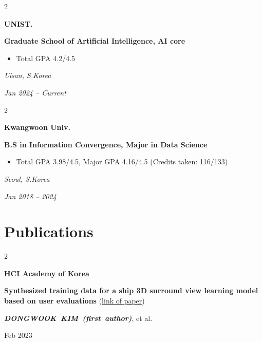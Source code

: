 \documentclass[10pt, letterpaper]{article}
\newenvironment{highlights}{
    \begin{itemize}[
        topsep=0.10 cm,
        parsep=0.10 cm,
        partopsep=0pt,
        itemsep=0pt,
        leftmargin=0.4 cm + 10pt
    ]
}{
    \end{itemize}
} %
\newenvironment{twocolentry}[2][]{
    \onecolentry
    \def\secondColumn{#2}
    \setcolumnwidth{\fill, 4.5 cm}
    \begin{paracol}{2}
}{
    \switchcolumn \raggedleft \secondColumn
    \end{paracol}
    \endonecolentry
} %
\let\hrefWithoutArrow\href
\renewcommand{\href}[2]{\hrefWithoutArrow{#1}{\ifthenelse{\equal{#2}{}}{ }{#2 }\raisebox{.15ex}{\footnotesize \faExternalLink*}}}
\begin{document}
        \begin{twocolentry}{
            \small\textit{Ulsan, S.Korea}
            
            \vspace{0.2cm}
            
            \textit{Jan 2024 – Current}
        }
            \textbf{\color{headingOrange}UNIST.}
            
            \vspace{0.2cm}
            
            \textbf{Graduate School of Artificial Intelligence, AI core}
            \begin{highlights}
                \item Total GPA 4.2/4.5
            \end{highlights}
        \end{twocolentry}


        \begin{twocolentry}{
            \small\textit{Seoul, S.Korea}
            
            \vspace{0.2cm}
            
            \textit{Jan 2018 – 2024}
        }
            \textbf{\color{headingOrange}Kwangwoon Univ.}
            
            \vspace{0.2cm}
            
            \textbf{B.S in Information Convergence, Major in Data Science}
            \begin{highlights}
                \item Total GPA 3.98/4.5, Major GPA 4.16/4.5 (Credits taken: 116/133)
            \end{highlights}
        \end{twocolentry}
        
        \vspace{0.2 cm}



    
    \section{Publications}


        
        \begin{twocolentry}{
            Feb 2023
        }
            \textbf{\color{headingOrange}HCI Academy of Korea}

            \textbf{Synthesized training data for a ship 3D surround view learning model based on user evaluations}
            (\hrefWithoutArrow{https://donguk071.github.io/}{\faLink link of paper}) 
 
            \mbox{\textbf{\textit{DONGWOOK KIM (first author)}}}, et al.
            
        
            \vspace{0.10 cm}
            
        \end{twocolentry}
\end{document}
